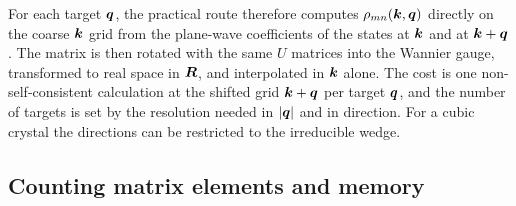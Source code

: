 For each target $\bm{q}$, the practical route therefore computes $\rho_{mn}(\bm{k},\bm{q})$ directly on the coarse $\bm{k}$ grid from the plane-wave coefficients of the states at $\bm{k}$ and at $\bm{k}+\bm{q}$. The matrix is then rotated with the same $U$ matrices into the Wannier gauge, transformed to real space in $\bm{R}$, and interpolated in $\bm{k}$ alone. The cost is one non-self-consistent calculation at the shifted grid $\bm{k}+\bm{q}$ per target $\bm{q}$, and the number of targets is set by the resolution needed in $|\bm{q}|$ and in direction. For a cubic crystal the directions can be restricted to the irreducible wedge.

\subsection{Counting matrix elements and memory}

